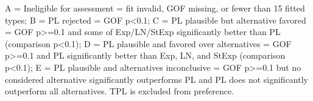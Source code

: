 \begin{flushleft}\footnotesize A = Ineligible for assessment = fit invalid, GOF missing, or fewer than 15 fitted types; B = PL rejected = GOF p<0.1; C = PL plausible but alternative favored = GOF p>=0.1 and some of Exp/LN/StExp significantly better than PL (comparison p<0.1); D = PL plausible and favored over alternatives = GOF p>=0.1 and PL significantly better than Exp, LN, and StExp (comparison p<0.1); E = PL plausible and alternatives inconclusive = GOF p>=0.1 but no considered alternative significantly outperforms PL and PL does not significantly outperform all alternatives. TPL is excluded from preference.\end{flushleft}
